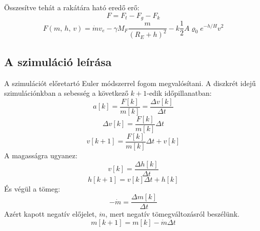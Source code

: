 \documentclass[12pt]{article}
\begin{document}
Összesítve tehát a rakátára ható eredő erő:
\begin{equation*}
    F = F_t - F_g - F_k
\end{equation*}
\begin{equation}
    F(m,\,h,\,v) = \dot{m}v_e - \gamma M_F\dfrac{m}{(R_E + h)^2} - k\frac{1}{2}A\varrho_0 e^{-h/H}v^2
\end{equation}

\subsection{A szimuláció leírása}
A szimulációt előretartó Euler módszerrel fogom megvalósítani. A diszkrét idejű szimulációnkban a sebesség a következő $k+1$-edik időpillanatban:
\[a[k] = \frac{F[k]}{m[k]} = \frac{\Delta v [k]}{\Delta t}\]
\[\Delta v[k] = \frac{F[k]}{m[k]}\Delta t\]
\begin{equation}
    v[k+1] = \frac{F[k]}{m[k]}\Delta t + v[k]
\end{equation}
A magasságra ugyanez:
\[v[k] = \frac{\Delta h[k]}{\Delta t}\]
\begin{equation}
    h[k+1] = v[k]\Delta t + h[k]
\end{equation}
És végül a tömeg:
\[-\dot{m} = \frac{\Delta m [k]}{\Delta t}\]
Azért kapott negatív előjelet, $\dot{m}$, mert negatív tömegváltozásról beszélünk.
\begin{equation}
    m[k+1] = m[k] - \dot{m}\Delta t
\end{equation}

\newpage
\printbibliography


\end{document}
